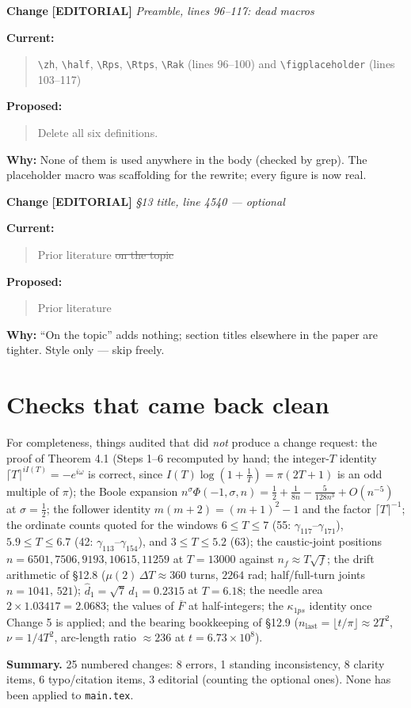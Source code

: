 \documentclass[11pt]{article}
\newcounter{chg}
\newcommand{\change}[3]{%
  \refstepcounter{chg}%
  \bigskip\par\noindent
  {\large\textbf{Change \thechg}}\quad
  {\color{#1}\textbf{[#2]}}\quad
  \textit{#3}\par\nobreak\smallskip}
\newenvironment{cur}{\par\noindent\textbf{Current:}\begin{quote}\color{delred}}{\end{quote}}
\newenvironment{prop}{\par\noindent\textbf{Proposed:}\begin{quote}\color{insblue}}{\end{quote}}
\newcommand{\why}[1]{\par\noindent\textbf{Why:} #1\par}
\begin{document}
\change{tagedt}{EDITORIAL}{Preamble, lines 96--117: dead macros}
\begin{cur}
\texttt{\textbackslash zh}, \texttt{\textbackslash half},
\texttt{\textbackslash Rps}, \texttt{\textbackslash Rtps},
\texttt{\textbackslash Rak} (lines 96--100) and
\texttt{\textbackslash figplaceholder} (lines 103--117)
\end{cur}
\begin{prop}
Delete all six definitions.
\end{prop}
\why{None of them is used anywhere in the body (checked by grep). The
placeholder macro was scaffolding for the rewrite; every figure is now real.}

\change{tagedt}{EDITORIAL}{\S{}13 title, line 4540 --- \emph{optional}}
\begin{cur}
Prior literature \sout{on the topic}
\end{cur}
\begin{prop}
Prior literature
\end{prop}
\why{``On the topic'' adds nothing; section titles elsewhere in the paper are
tighter. Style only --- skip freely.}

\section*{Checks that came back clean}

For completeness, things audited that did \emph{not} produce a change request:
the proof of Theorem 4.1 (Steps 1--6 recomputed by hand; the integer-$T$
identity $\lceil T\rceil^{iI(T)}=-e^{i\omega}$ is correct, since
$I(T)\log(1+\tfrac1T)=\pi(2T+1)$ is an odd multiple of $\pi$); the Boole
expansion $n^{\sigma}\Phi(-1,\sigma,n)=\tfrac12+\tfrac1{8n}-\tfrac5{128n^3}+
O(n^{-5})$ at $\sigma=\tfrac12$; the follower identity
$m(m+2)=(m+1)^2-1$ and the factor $\lceil T\rceil^{-1}$; the ordinate counts
quoted for the windows $6\le T\le7$ (55: $\gamma_{117}$--$\gamma_{171}$),
$5.9\le T\le6.7$ (42: $\gamma_{113}$--$\gamma_{154}$), and $3\le T\le5.2$
(63); the caustic-joint positions $n=6501,7506,9193,10615,11259$ at $T=13000$
against $n_f\approx T\sqrt f$; the drift arithmetic of \S{}12.8
($\mu(2)\,\Delta T\approx360$ turns, $2264$ rad; half/full-turn joints
$n=1041$, $521$); $\hat d_1=\sqrt7\,d_1=0.2315$ at $T=6.18$; the needle area
$2\times1.03417=2.0683$; the values of $\overline F$ at half-integers; the
$\kappa_{1ps}$ identity once Change 5 is applied; and the bearing bookkeeping
of \S{}12.9 ($n_{\mathrm{last}}=\lfloor t/\pi\rfloor\approx2T^2$,
$\nu=1/4T^2$, arc-length ratio $\approx236$ at $t=6.73\times10^8$).

\bigskip
\noindent\textbf{Summary.} 25 numbered changes: 8 errors, 1 standing
inconsistency, 8 clarity items, 6 typo/citation items, 3 editorial
(counting the optional ones). None has been applied to \texttt{main.tex}.
\end{document}
